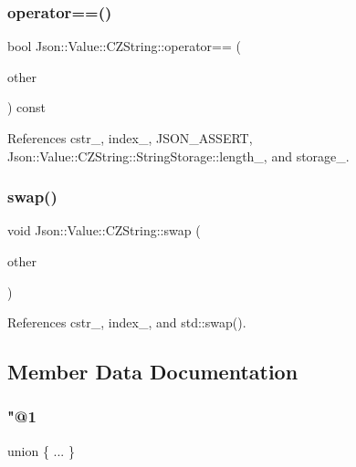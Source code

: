 \subsubsection{\texorpdfstring{operator==()}{operator==()}}
{\footnotesize\ttfamily bool Json\+::\+Value\+::\+C\+Z\+String\+::operator== (\begin{DoxyParamCaption}\item[{\hyperlink{classJson_1_1Value_1_1CZString}{C\+Z\+String} const \&}]{other }\end{DoxyParamCaption}) const}



References cstr\+\_\+, index\+\_\+, J\+S\+O\+N\+\_\+\+A\+S\+S\+E\+RT, Json\+::\+Value\+::\+C\+Z\+String\+::\+String\+Storage\+::length\+\_\+, and storage\+\_\+.

\mbox{\label{classJson_1_1Value_1_1CZString_ad59f3542d2eea749a6a63409d1a02207_ad59f3542d2eea749a6a63409d1a02207}} 
\subsubsection{\texorpdfstring{swap()}{swap()}}
{\footnotesize\ttfamily void Json\+::\+Value\+::\+C\+Z\+String\+::swap (\begin{DoxyParamCaption}\item[{\hyperlink{classJson_1_1Value_1_1CZString}{C\+Z\+String} \&}]{other }\end{DoxyParamCaption})\hspace{0.3cm}{\ttfamily [private]}}



References cstr\+\_\+, index\+\_\+, and std\+::swap().



\subsection{Member Data Documentation}
\mbox{\label{classJson_1_1Value_1_1CZString_a6f6b20ee7c8873fba58100f869ca2e5e_a6f6b20ee7c8873fba58100f869ca2e5e}} 
\subsubsection{\texorpdfstring{"@1}{@1}}
{\footnotesize\ttfamily union \{ ... \} \hspace{0.3cm}{\ttfamily [private]}}

